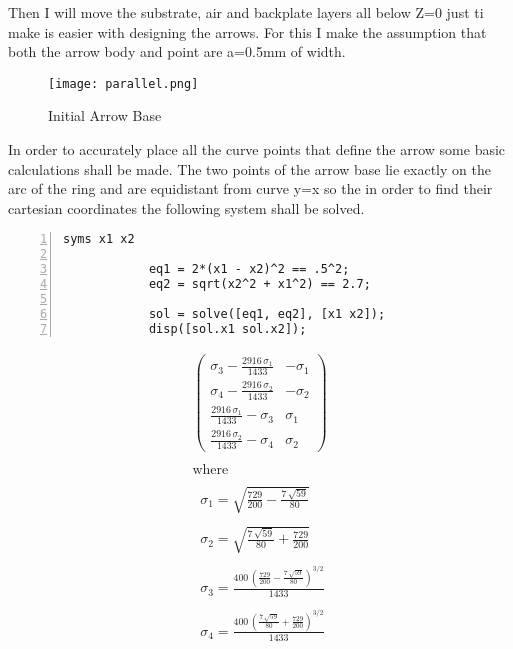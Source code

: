         Then I will move the substrate, air and backplate layers all below Z=0 just ti make is easier
        with designing the arrows. For this I make the assumption that both the arrow body and point are
        a=0.5mm of width. 
        \begin{figure}[h]
            \centering
            \texttt{[image: parallel.png]}
            \caption{Initial Arrow Base}
            \label{img:parallel}
        \end{figure}
        In order to accurately place all the curve points that define the arrow some basic calculations
        shall be made. The two points of the arrow base lie exactly on the arc of the ring and are 
        equidistant from curve y=x so the in order to find their cartesian coordinates the following
        system shall be solved. 

        \begin{lstlisting}[frame=single, numbers=left, style=Matlab-Pyglike]
            syms x1 x2

            eq1 = 2*(x1 - x2)^2 == .5^2;
            eq2 = sqrt(x2^2 + x1^2) == 2.7;

            sol = solve([eq1, eq2], [x1 x2]);
            disp([sol.x1 sol.x2]);  
        \end{lstlisting}
        
        \begin{equation}
            \label{eq:xysys}
            \displaystyle \begin{array}{l} 
                \left(\begin{array}{cc} 
                    \sigma_3 -\frac{2916\,\sigma_1 }{1433} & -\sigma_1 \\
                    \sigma_4 -\frac{2916\,\sigma_2 }{1433} & -\sigma_2 \\
                    \frac{2916\,\sigma_1 }{1433}-\sigma_3  & \sigma_1 \\
                    \frac{2916\,\sigma_2 }{1433}-\sigma_4  & \sigma_2  
                \end{array}\right)\\
                \mathrm{}\\
                \textrm{where}\\
                \mathrm{}\\
                \;\;\sigma_1 =\sqrt{\frac{729}{200}-\frac{7\,\sqrt{59}}{80}}\\
                \mathrm{}\\
                \;\;\sigma_2 =\sqrt{\frac{7\,\sqrt{59}}{80}+\frac{729}{200}}\\
                \mathrm{}\\
                \;\;\sigma_3 =\frac{400\,{{\left(\frac{729}{200}-\frac{7\,\sqrt{59}}{80}\right)}}^{3/2} }{1433}\\
                \mathrm{}\\
                \;\;\sigma_4 =\frac{400\,{{\left(\frac{7\,\sqrt{59}}{80}+\frac{729}{200}\right)}}^{3/2} }{1433}
            \end{array}
        \end{equation}

